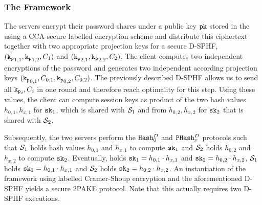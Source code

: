 \subsubsection{The Framework}
The servers encrypt their password shares under a public key $\mathtt{pk}$ stored in the \crs using a \ac{CCA}-secure labelled encryption scheme and distribute this ciphertext together with two appropriate projection keys for a secure \ac{D-SPHF}, $(\mathtt{k_p}_{1,1},\mathtt{k_p}_{1,2},C_1)$ and $(\mathtt{k_p}_{2,1},\mathtt{k_p}_{2,2},C_2)$.
The client computes two independent encryptions of the password and generates two independent according projection keys $(\mathtt{k_p}_{0,1},C_{0,1},\mathtt{k_p}_{0,2},C_{0,2})$.
The previously described \ac{D-SPHF} allows us to send all $\mathtt{k_p}_i,C_i$ in one round and therefore reach optimality for this step.
Using these values, the client can compute session keys as product of the two hash values $h_{0,1},h_{x,1}$ for $\mathtt{sk}_1$, which is shared with $\mathcal{S}_1$ and from $h_{0,2},h_{x,2}$ for $\mathtt{sk}_2$ that is shared with $\mathcal{S}_2$.

Subsequently, the two servers perform the $\mathtt{Hash}_0^D$ and $\mathtt{PHash}_x^D$ protocols such that $\mathcal{S}_1$ holds hash values $h_{0,1}$ and $h_{x,1}$ to compute $\mathtt{sk}_1$ and $\mathcal{S}_2$ holds $h_{0,2}$ and $h_{x,2}$ to compute $\mathtt{sk}_2$.
Eventually, \Client holds $\mathtt{sk}_1=h_{0,1}\cdot h_{x,1}$ and $\mathtt{sk}_2=h_{0,2}\cdot h_{x,2}$, $\mathcal{S}_1$ holds $\mathtt{sk}_1=h_{0,1}\cdot h_{x,1}$ and $\mathcal{S}_2$ holds $\mathtt{sk}_2=h_{0,2}\cdot h_{x,2}$.
An instantiation of the framework using labelled Cramer-Shoup encryption and the aforementioned \ac{D-SPHF} yields a secure \ac{2PAKE} protocol.
Note that this actually requires two \ac{D-SPHF} executions.

